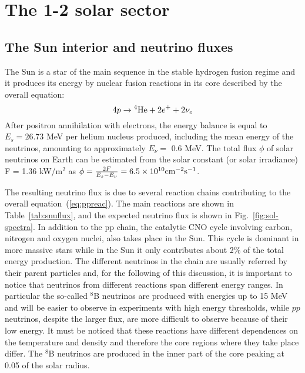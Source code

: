 \section{The 1-2 solar sector}
\label{sec:solar}

\subsection{The Sun interior and neutrino fluxes}

The Sun is a star of the main sequence in the stable hydrogen fusion regime and it produces its energy by nuclear fusion reactions in its core described by the overall equation:
\begin{equation}
4p \rightarrow {}{^4}{\rm He} + 2 e^+ + 2 \nu_e
\label{eq:ppreac}
\end{equation}
After positron annihilation with electrons, the energy balance is equal to $E_s =26.73$ MeV per helium nucleus produced, including the mean energy of the neutrinos, amounting to approximately $E_\nu =$ 0.6 MeV. The total flux $\phi$ of solar neutrinos on Earth can be estimated from the solar constant (or solar irradiance) F = 1.36 kW/m$^2$  as
$\phi = \frac{2F}{E_s - E_\nu} = 6.5 \times 10^{10} {\rm cm^{-2} s^{-1}}$.

The resulting neutrino flux is due to several reaction chains contributing to the overall equation~(\ref{eq:ppreac}). The main reactions are shown in Table~\ref{tab:snuflux}, and the expected neutrino flux is shown in Fig.~\ref{fig:sol-spectra}. In addition to the pp chain, the catalytic CNO cycle involving carbon, nitrogen and oxygen nuclei, also takes place in the Sun. This cycle is dominant in more massive stars while in the Sun it only contributes about 2\% of the total energy production. 
The different neutrinos in the chain are usually referred by their parent particles  and, for the following of this discussion, it is important to notice that neutrinos from different reactions span different energy ranges. In particular the so-called $^{8}$B neutrinos are produced with energies up to 15 MeV and will be easier to observe in experiments with high energy thresholds, while $pp$ neutrinos, despite the larger flux, are more difficult to observe because of their low energy.
It must be noticed that these reactions have different dependences on the temperature and density and therefore the core regions where they take place differ. The $^8$B neutrinos are produced in the inner part of the core peaking at 0.05 of the solar radius. 


